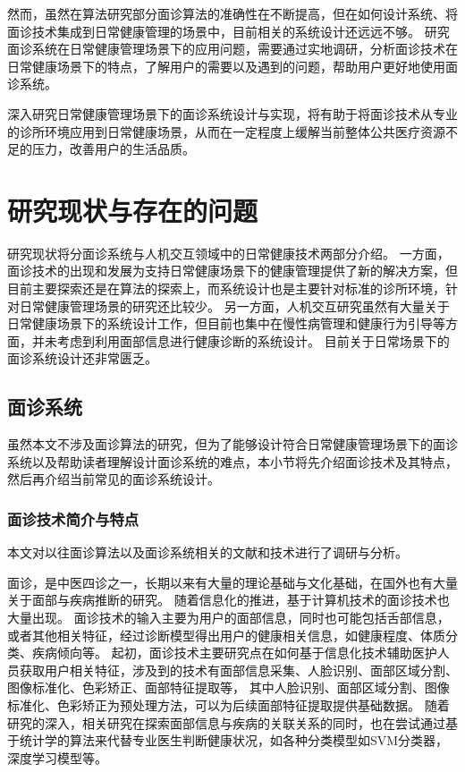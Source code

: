 然而，虽然在算法研究部分面诊算法的准确性在不断提高，但在如何设计系统、将面诊技术集成到日常健康管理的场景中，目前相关的系统设计还远远不够。
研究面诊系统在日常健康管理场景下的应用问题，需要通过实地调研，分析面诊技术在日常健康场景下的特点，了解用户的需要以及遇到的问题，帮助用户更好地使用面诊系统。

深入研究日常健康管理场景下的面诊系统设计与实现，将有助于将面诊技术从专业的诊所环境应用到日常健康场景，从而在一定程度上缓解当前整体公共医疗资源不足的压力，改善用户的生活品质。

\section{研究现状与存在的问题}
研究现状将分面诊系统与人机交互领域中的日常健康技术两部分介绍。
一方面，面诊技术的出现和发展为支持日常健康场景下的健康管理提供了新的解决方案，但目前主要探索还是在算法的探索上，而系统设计也是主要针对标准的诊所环境，针对日常健康管理场景的研究还比较少。
另一方面，人机交互研究虽然有大量关于日常健康场景下的系统设计工作，但目前也集中在慢性病管理和健康行为引导等方面，并未考虑到利用面部信息进行健康诊断的系统设计。
目前关于日常场景下的面诊系统设计还非常匮乏。


\subsection{面诊系统}
虽然本文不涉及面诊算法的研究，但为了能够设计符合日常健康管理场景下的面诊系统以及帮助读者理解设计面诊系统的难点，本小节将先介绍面诊技术及其特点，然后再介绍当前常见的面诊系统设计。
\subsubsection{面诊技术简介与特点}
本文对以往面诊算法以及面诊系统相关的文献和技术进行了调研与分析。

面诊，是中医四诊之一，长期以来有大量的理论基础与文化基础，在国外也有大量关于面部与疾病推断的研究。
随着信息化的推进，基于计算机技术的面诊技术也大量出现。
面诊技术的输入主要为用户的面部信息，同时也可能包括舌部信息，或者其他相关特征，经过诊断模型得出用户的健康相关信息，如健康程度、体质分类、疾病倾向等。
起初，面诊技术主要研究点在如何基于信息化技术辅助医护人员获取用户相关特征，涉及到的技术有面部信息采集、人脸识别、面部区域分割、图像标准化、色彩矫正、面部特征提取等\cite{宋海贝2018中医面诊信息自动识别方法研究进展}，
其中人脸识别、面部区域分割、图像标准化、色彩矫正为预处理方法，可以为后续面部特征提取提供基础数据。
随着研究的深入，相关研究在探索面部信息与疾病的关联关系的同时，也在尝试通过基于统计学的算法来代替专业医生判断健康状况，如各种分类模型如SVM分类器，深度学习模型等\cite{林锋2019中医面诊系统调研报告}。

